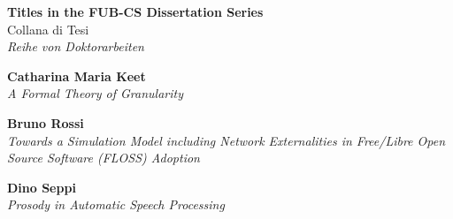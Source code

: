 \pagestyle{empty}

\noindent
\begin{center}
\textbf{Titles in the FUB-CS Dissertation Series}\\
Collana di Tesi\\
{\em Reihe von Doktorarbeiten}
\par\vspace {1cm}
\end{center}

\newcommand{\fubcspublication}[3]{\item[FUB-CS #1: ]{\bf #2}\\{\em #3}}

\begin{list}{}{ \settowidth{\leftmargin}{ILL}
		\setlength{\rightmargin}{0in}
		\setlength{\labelwidth}{\leftmargin}
		\setlength{\labelsep}{0in}
}

\fubcspublication{DS-2008-01}{Catharina Maria Keet}{A Formal Theory of Granularity}
\fubcspublication{DS-2008-02}{Bruno Rossi}{Towards a Simulation Model including Network Externalities in Free/Libre Open Source Software (FLOSS) Adoption}
\fubcspublication{DS-2008-03}{Dino Seppi}{Prosody in Automatic Speech Processing}

\end{list}

\clearpage
\mbox{ }
\newpage


